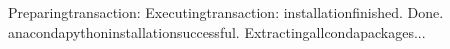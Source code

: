 \documentclass[a4paper,10pt,english]{sphinxmanual}
\begin{document}
\begin{sphinxVerbatim}[commandchars=\\\{\}]
Preparingtransaction:
Executingtransaction:
installationfinished.
\PYGZhy{}\PYGZhy{}\PYGZhy{}\PYGZhy{}\PYGZhy{}\PYGZhy{}\PYGZhy{}\PYGZhy{}\PYGZhy{}\PYGZhy{}\PYGZhy{}\PYGZhy{}\PYGZhy{}\PYGZhy{}\PYGZhy{}\PYGZhy{}\PYGZhy{}\PYGZhy{}\PYGZhy{}\PYGZhy{}\PYGZhy{}\PYGZhy{}\PYGZhy{}\PYGZhy{}\PYGZhy{}\PYGZhy{}\PYGZhy{}\PYGZhy{}\PYGZhy{}\PYGZhy{}\PYGZhy{}\PYGZhy{}\PYGZhy{}\PYGZhy{}\PYGZhy{}\PYGZhy{}\PYGZhy{}\PYGZhy{}\PYGZhy{}\PYGZhy{}\PYGZhy{}\PYGZhy{}\PYGZhy{}\PYGZhy{}\PYGZhy{}\PYGZhy{}\PYGZhy{}\PYGZhy{}\PYGZhy{}\PYGZhy{}\PYGZhy{}\PYGZhy{}\PYGZhy{}\PYGZhy{}\PYGZhy{}\PYGZhy{}\PYGZhy{}\PYGZhy{}\PYGZhy{}\PYGZhy{}\PYGZhy{}\PYGZhy{}\PYGZhy{}\PYGZhy{}\PYGZhy{}\PYGZhy{}\PYGZhy{}\PYGZhy{}\PYGZhy{}\PYGZhy{}\PYGZhy{}\PYGZhy{}
Done.
anacondapythoninstallationsuccessful.
\PYGZhy{}\PYGZhy{}\PYGZhy{}\PYGZhy{}\PYGZhy{}\PYGZhy{}\PYGZhy{}\PYGZhy{}\PYGZhy{}\PYGZhy{}\PYGZhy{}\PYGZhy{}\PYGZhy{}\PYGZhy{}\PYGZhy{}\PYGZhy{}\PYGZhy{}\PYGZhy{}\PYGZhy{}\PYGZhy{}\PYGZhy{}\PYGZhy{}\PYGZhy{}\PYGZhy{}\PYGZhy{}\PYGZhy{}\PYGZhy{}\PYGZhy{}\PYGZhy{}\PYGZhy{}\PYGZhy{}\PYGZhy{}\PYGZhy{}\PYGZhy{}\PYGZhy{}\PYGZhy{}\PYGZhy{}\PYGZhy{}\PYGZhy{}\PYGZhy{}\PYGZhy{}\PYGZhy{}\PYGZhy{}\PYGZhy{}\PYGZhy{}\PYGZhy{}\PYGZhy{}\PYGZhy{}\PYGZhy{}\PYGZhy{}\PYGZhy{}\PYGZhy{}\PYGZhy{}\PYGZhy{}\PYGZhy{}\PYGZhy{}\PYGZhy{}\PYGZhy{}\PYGZhy{}\PYGZhy{}\PYGZhy{}\PYGZhy{}\PYGZhy{}\PYGZhy{}\PYGZhy{}\PYGZhy{}\PYGZhy{}\PYGZhy{}\PYGZhy{}\PYGZhy{}\PYGZhy{}\PYGZhy{}
Extractingallcondapackages...
\PYGZhy{}\PYGZhy{}\PYGZhy{}\PYGZhy{}\PYGZhy{}\PYGZhy{}\PYGZhy{}\PYGZhy{}\PYGZhy{}\PYGZhy{}\PYGZhy{}\PYGZhy{}\PYGZhy{}\PYGZhy{}\PYGZhy{}\PYGZhy{}\PYGZhy{}\PYGZhy{}\PYGZhy{}\PYGZhy{}\PYGZhy{}\PYGZhy{}\PYGZhy{}\PYGZhy{}\PYGZhy{}\PYGZhy{}\PYGZhy{}\PYGZhy{}\PYGZhy{}\PYGZhy{}\PYGZhy{}\PYGZhy{}\PYGZhy{}\PYGZhy{}\PYGZhy{}\PYGZhy{}\PYGZhy{}\PYGZhy{}\PYGZhy{}\PYGZhy{}\PYGZhy{}\PYGZhy{}\PYGZhy{}\PYGZhy{}\PYGZhy{}\PYGZhy{}\PYGZhy{}\PYGZhy{}\PYGZhy{}\PYGZhy{}\PYGZhy{}\PYGZhy{}\PYGZhy{}\PYGZhy{}\PYGZhy{}\PYGZhy{}\PYGZhy{}\PYGZhy{}\PYGZhy{}\PYGZhy{}\PYGZhy{}\PYGZhy{}\PYGZhy{}\PYGZhy{}\PYGZhy{}\PYGZhy{}\PYGZhy{}\PYGZhy{}\PYGZhy{}\PYGZhy{}\PYGZhy{}\PYGZhy{}


\end{sphinxVerbatim}
\end{document}

